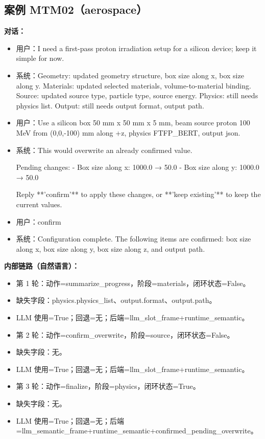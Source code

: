 \documentclass[11pt]{ctexart}
\begin{document}
\subsection{案例 MTM02（aerospace）}
\textbf{对话：}
\begin{itemize}
\item 用户：I need a first-pass proton irradiation setup for a silicon device; keep it simple for now.
\item 系统：Geometry: updated geometry structure, box size along x, box size along y. Materials: updated selected materials, volume-to-material binding. Source: updated source type, particle type, source energy. Physics: still needs physics list. Output: still needs output format, output path.
\item 用户：Use a silicon box 50 mm x 50 mm x 5 mm, beam source proton 100 MeV from (0,0,-100) mm along +z, physics FTFP\_BERT, output json.
\item 系统：This would overwrite an already confirmed value.

Pending changes:
- Box size along x: 1000.0 → 50.0
- Box size along y: 1000.0 → 50.0

Reply **'confirm'** to apply these changes, or **'keep existing'** to keep the current values.
\item 用户：confirm
\item 系统：Configuration complete. The following items are confirmed: box size along x, box size along y, box size along z, and output path.
\end{itemize}
\textbf{内部链路（自然语言）：}
\begin{itemize}
\item 第 1 轮：动作=summarize\_progress，阶段=materials，闭环状态=False。
\item 缺失字段：physics.physics\_list、output.format、output.path。
\item LLM 使用=True；回退=无；后端=llm\_slot\_frame+runtime\_semantic。
\item 第 2 轮：动作=confirm\_overwrite，阶段=source，闭环状态=False。
\item 缺失字段：无。
\item LLM 使用=True；回退=无；后端=llm\_slot\_frame+runtime\_semantic。
\item 第 3 轮：动作=finalize，阶段=physics，闭环状态=True。
\item 缺失字段：无。
\item LLM 使用=True；回退=无；后端=llm\_semantic\_frame+runtime\_semantic+confirmed\_pending\_overwrite。
\end{itemize}
\end{document}
